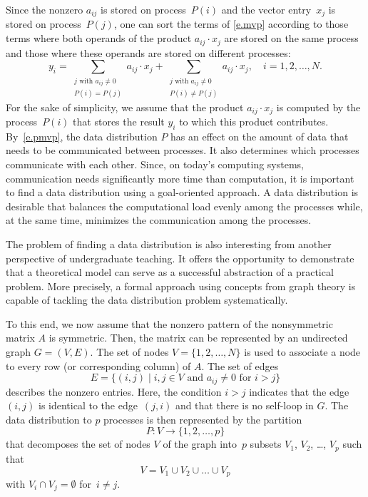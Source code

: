 \documentclass[12pt, oneside]{book}
\newcommand{\mat}[1]{\ensuremath{#1}}
\begin{document}
Since the nonzero $a_{ij}$ is stored on process~$P(i)$ and the vector entry~$x_j$ is
stored on process~$P(j)$, one can sort the terms of \eqref{e.mvp} according to
those terms where both operands of the product $a_{ij} \cdot x_j$ are stored on the same
process and those where these operands are stored on different processes:
\begin{equation}
\label{e.pmvp}
y_i =
  \sum_{ \substack{j  \text{ with }  a_{ij} \neq 0\\ P(i)=P(j)}} a_{ij} \cdot x_j
+ \sum_{ \substack{j  \text{ with }  a_{ij} \neq 0\\ P(i)\neq P(j)}} a_{ij} \cdot x_j ,
\quad i = 1, 2, \dots, N.
\end{equation}
For the sake of simplicity, we assume that the product $a_{ij} \cdot x_j$ is computed by
the process~$P(i)$ that stores the result $y_i$ to which this product contributes.
By~\eqref{e.pmvp}, the data distribution  $P$ has an effect on the amount of data that
needs to be communicated between processes. It also determines which processes
communicate with each other. Since, on today's computing systems, communication needs
significantly more time than computation, it is important to find a data distribution
using a goal-oriented approach. A data distribution is desirable that balances the
computational load evenly among the processes while, at the same time, minimizes the
communication among the processes.

The problem of finding a data distribution is also interesting from another perspective
of undergraduate teaching. It offers the opportunity to demonstrate that a theoretical
model can serve as a successful abstraction of a practical problem. More precisely, a
formal approach using concepts from graph theory is capable of tackling the data
distribution problem systematically.

To this end, we now assume that the nonzero pattern of the nonsymmetric matrix \mat{A} is
symmetric. Then, the matrix can be represented by an undirected graph $G=(V,E)$. The set
of nodes $V = \{ 1, 2, \dots, N\}$ is used to associate a node to every row (or
corresponding column) of \mat{A}. The set of edges
\begin{displaymath}
E = \{ (i,j) \mid i, j \in V \text{ and } a_{ij} \neq 0 \text{ for }  i > j \}
\end{displaymath}
describes the nonzero entries. Here, the condition $i>j$ indicates that the edge~$(i,j)$
is identical to the edge~$(j,i)$ and that there is no self-loop in $G$. The data
distribution to $p$ processes is then represented by the partition
$$
P:  V \rightarrow \{1, 2, \dots, p\}
$$
that decomposes the set of nodes $V$ of the graph into~$p$ subsets $V_1$, $V_2$, \dots,
$V_p$ such that
$$
V = V_1 \cup V_2 \cup \dots \cup V_p
$$
with $V_i \cap V_j = \emptyset$ for~$i \neq j$.
\end{document}
